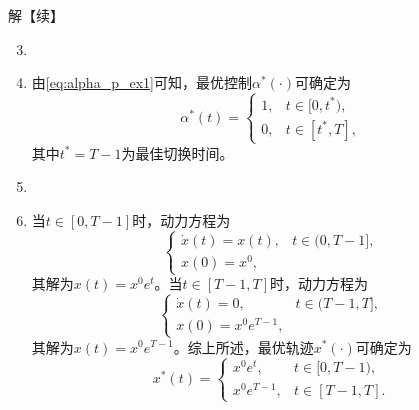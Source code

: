 \begin{frame}{\subsecname}
\small 
\begin{block}{解【续】}

\begin{enumerate} 
\setcounter{enumi}{2}
\item {}
\item[]  由\eqref{eq:alpha_p_ex1}可知，最优控制$\alpha^*(\cdot)$可确定为
$$
\alpha^*(t) = \left\{
\begin{array}{cl}
    1, &  t \in[0, t^*), \\[.04in]
    0, &  t \in[t^*, T],
\end{array}
\right.
$$
其中$t^*=T-1$为最佳切换时间。\pause \\[.1in]
\item {}
\item[] 当$t\in[0, T-1]$时，动力方程为
$$
\left\{
\begin{array}{ll}
    \dot x(t) = x(t),  &  t \in (0, T-1], \\[.04in]
     x(0) = x^0, & 
\end{array}
\right.
$$
其解为$x(t) = x^0 e^t$。当$t\in[T-1, T]$时，动力方程为
$$
\left\{
\begin{array}{ll}
    \dot x(t) = 0,  &  t \in (T-1, T], \\[.04in]
     x(0) = x^0 e^{T-1}, & 
\end{array}
\right.
$$
其解为$x(t) = x^0 e^{T-1}$。综上所述，最优轨迹$x^*(\cdot)$可确定为
$$
x^*(t) = \left\{
\begin{array}{cl}
    x^0 e^t, &  t \in[0, T-1), \\[.04in]
    x^0 e^{T-1}, &  t \in[T-1, T].
\end{array}
\right.
$$
\end{enumerate}
\end{block}
\end{frame}

